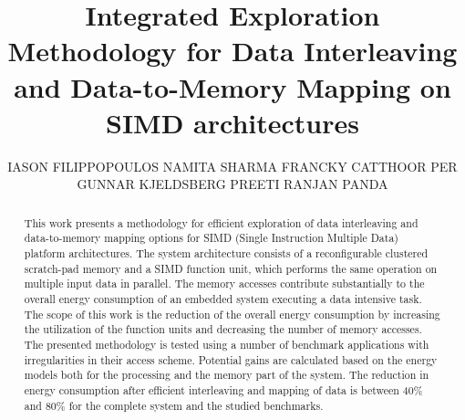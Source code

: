 \documentclass[prodmode,acmtecs]{acmsmall}
\begin{document}

\title{Integrated Exploration Methodology for Data Interleaving and Data-to-Memory Mapping on SIMD architectures}
\author{IASON FILIPPOPOULOS
NAMITA SHARMA 
FRANCKY CATTHOOR
PER GUNNAR KJELDSBERG
PREETI RANJAN PANDA
}

\begin{abstract}
This work presents a methodology for efficient exploration of data interleaving and data-to-memory mapping options for SIMD (Single Instruction Multiple Data) platform architectures.
The system architecture consists of  a reconfigurable clustered scratch-pad memory and a SIMD function unit, which performs the same operation on multiple input data in parallel. 
The memory accesses contribute substantially to the overall energy consumption of an embedded system executing a data intensive task. 
The scope of this work is the reduction of the overall energy consumption by increasing the utilization of the function units and decreasing the number of memory accesses.
The presented methodology is tested using a number of benchmark applications with irregularities in their access scheme.
Potential gains are calculated based on the energy models both for the processing and the memory part of the system.
The reduction in energy consumption after efficient interleaving and mapping of data is between 40\% and 80\% for the complete system and the studied benchmarks.
\end{abstract}




\end{document}
